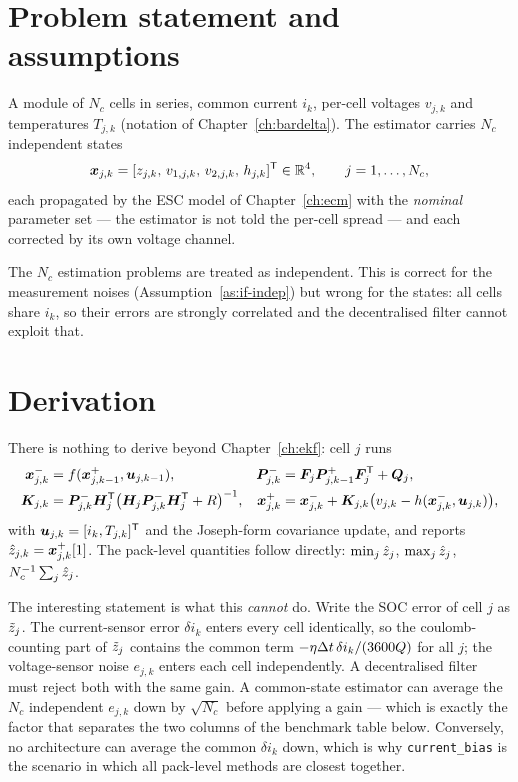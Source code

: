 \section{Problem statement and assumptions}
A module of $N_c$ cells in series, common current $i_k$, per-cell voltages $v_{j,k}$ and
temperatures $T_{j,k}$ (notation of Chapter~\ref{ch:bardelta}). The estimator carries $N_c$
independent states
\begin{equation}
\bm{x}_{j,k} = [z_{j,k},\,v_{1,j,k},\,v_{2,j,k},\,h_{j,k}]^{\mathsf{T}}\in\mathbb{R}^{4},\qquad j=1,\dots,N_c,
\label{eq:dek-state}
\end{equation}
each propagated by the ESC model of Chapter~\ref{ch:ecm} with the \emph{nominal} parameter set ---
the estimator is not told the per-cell spread --- and each corrected by its own voltage channel.

\begin{assumption}\label{as:dek-nocross}
The $N_c$ estimation problems are treated as independent. This is correct for the measurement
noises (Assumption~\ref{as:if-indep}) but wrong for the states: all cells share $i_k$, so their
errors are strongly correlated and the decentralised filter cannot exploit that.
\end{assumption}

\section{Derivation}
There is nothing to derive beyond Chapter~\ref{ch:ekf}: cell $j$ runs
\begin{align}
\bm{x}^-_{j,k} &= f(\bm{x}^+_{j,k-1},\bm{u}_{j,k-1}), &
\bm{P}^{-}_{j,k} &= \bm{F}_j\bm{P}^{+}_{j,k-1}\bm{F}_j^{\mathsf{T}} + \bm{Q}_j, \label{eq:dek-tu}\\
\bm{K}_{j,k} &= \bm{P}^{-}_{j,k}\bm{H}_j^{\mathsf{T}}\big(\bm{H}_j\bm{P}^{-}_{j,k}\bm{H}_j^{\mathsf{T}}+R\big)^{-1}, &
\bm{x}^+_{j,k} &= \bm{x}^-_{j,k}+\bm{K}_{j,k}\big(v_{j,k}-h(\bm{x}^-_{j,k},\bm{u}_{j,k})\big),
\label{eq:dek-mu}
\end{align}
with $\bm{u}_{j,k}=[i_k,T_{j,k}]^{\mathsf{T}}$ and the Joseph-form covariance update, and reports
$\hat{z}_{j,k} = \bm{x}^+_{j,k}[1]$. The pack-level quantities follow directly:
$\min_j\hat{z}_j$, $\max_j\hat{z}_j$, $N_c^{-1}\sum_j\hat{z}_j$.

The interesting statement is what this \emph{cannot} do. Write the SOC error of cell $j$ as
$\tilde{z}_j$. The current-sensor error $\delta i_k$ enters every cell identically, so the
coulomb-counting part of $\tilde{z}_j$ contains the common term
$-\eta\Delta t\,\delta i_k/(3600 Q)$ for all $j$; the voltage-sensor noise $e_{j,k}$ enters each cell
independently. A decentralised filter must reject both with the same gain. A common-state
estimator can average the $N_c$ independent $e_{j,k}$ down by $\sqrt{N_c}$ before applying a gain
--- which is exactly the factor that separates the two columns of the benchmark table below.
Conversely, no architecture can average the common $\delta i_k$ down, which is why
\texttt{current\_bias} is the scenario in which all pack-level methods are closest together.

